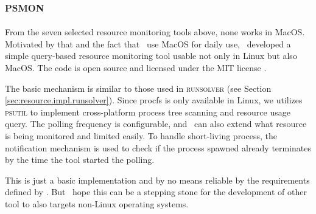 
\subsection{\textsc{psmon}}
\label{sec:res.psmon}

From the seven selected resource monitoring tools above, none works in MacOS.
Motivated by that and the fact that \first~use MacOS for daily use, \first~developed a simple query-based resource monitoring tool usable not only in Linux but also MacOS.
The code is open source and licensed under the MIT license \citep{kautsarPsmonMonitorsLimits2019}.

The basic mechanism is similar to those used in \textsc{runsolver} (see Section \ref{sec:resource.impl.runsolver}).
Since procfs is only available in Linux, we utilizes \textsc{psutil} to implement cross-platform process tree scanning and resource usage query.
The polling frequency is configurable, and \first~can also extend what resource is being monitored and limited easily.
To handle short-living process, the notification mechanism  is used to check if the process spawned already terminates by the time the tool started the polling.

This is just a basic implementation and by no means reliable by the requirements defined by \citet{beyerReliableBenchmarkingRequirements2019}.
But \first~hope this can be a stepping stone for the development of other tool to also targets non-Linux operating systems.


